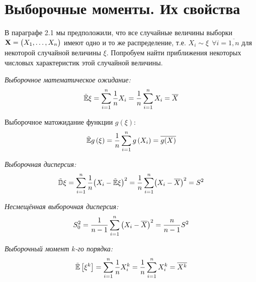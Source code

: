 \section{Выборочные моменты. Их свойства}

В параграфе 2.1 мы предположили, что все случайные величины выборки $\mathbf{X}= \bigl(X_1, \ldots, X_n \bigr)$ имеют одно и то же распределение, т.е. $X_i \sim \xi~~\forall i = \overline{1, n}$ для некоторой случайной величины $\xi$. 
Попробуем найти приближения некоторых числовых характеристик этой случайной величины.
\begin{defn}
    \textit{Выборочное математическое ожидание:} 
    \begin{equation*}
        \tilde{\operatorname{\mathbb{E}} } \xi =
        \sum\limits_{i=1}^{n} \frac{1}{n} X_{i} =
        \frac{1}{n} \sum\limits_{i=1}^{n} X_{i} =
        \overline{X}
    \end{equation*}

    Выборочное матожидание функции $g(\xi)$:
    \begin{equation*}
        \tilde{\operatorname{\mathbb{E}} } g\left(\xi \right) = 
        \frac{1}{n} \sum\limits_{i=1}^{n} g\left(X_{i}\right) =
        \overline{g(X)}
    \end{equation*}
\end{defn}

\begin{defn}
    \textit{Выборочная дисперсия:}
    \begin{equation*}
        \tilde{\operatorname{\mathbb{D}} } \xi = 
        \sum\limits_{i=1}^{n} \frac{1}{n} \bigl(X_{i}-\tilde{\operatorname{\mathbb{E}} } \xi \bigr)^{2} = 
        \frac{1}{n} \sum\limits_{i=1}^{n} \bigl(X_{i}-\overline{X} \bigr)^{2} =
        S^{2}
    \end{equation*}
\end{defn}

\begin{defn}
    \textit{Несмещённая выборочная дисперсия:} 
    \begin{equation*}
        S_{0}^{2} = 
        \frac{1}{n-1} \sum\limits_{i=1}^{n}\left(X_{i}-\overline{X}\right)^{2} =
        \frac{n}{n-1} S^2
    \end{equation*}
\end{defn}

\begin{defn}
    \textit{Выборочный момент $k$-го порядка:}
    \begin{equation*}
        \tilde{\operatorname{\mathbb{E}} } \left[ \xi^{k} \right] = 
        \sum\limits_{i=1}^{n} \frac{1}{n} X_{i}^{k} =
        \frac{1}{n} \sum\limits_{i=1}^{n} X_{i}^{k} =
        \overline{X^{k}}
    \end{equation*}
\end{defn}

